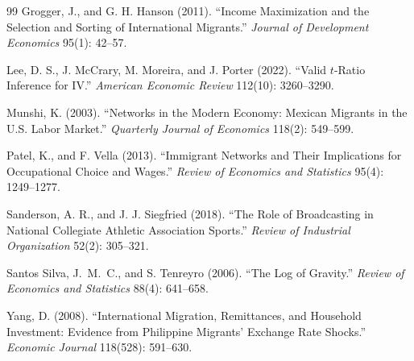 \documentclass[11pt]{article}
\begin{document}
\begin{thebibliography}{99}
Grogger, J., and G. H. Hanson (2011).
``Income Maximization and the Selection and Sorting of International
Migrants.''
\textit{Journal of Development Economics} 95(1): 42--57.

Lee, D. S., J. McCrary, M. Moreira, and J. Porter (2022).
``Valid $t$-Ratio Inference for IV.''
\textit{American Economic Review} 112(10): 3260--3290.

Munshi, K. (2003).
``Networks in the Modern Economy: Mexican Migrants in the U.S.
Labor Market.''
\textit{Quarterly Journal of Economics} 118(2): 549--599.

Patel, K., and F. Vella (2013).
``Immigrant Networks and Their Implications for Occupational Choice
and Wages.''
\textit{Review of Economics and Statistics} 95(4): 1249--1277.

Sanderson, A. R., and J. J. Siegfried (2018).
``The Role of Broadcasting in National Collegiate Athletic
Association Sports.''
\textit{Review of Industrial Organization} 52(2): 305--321.

Santos Silva, J.\ M.\ C., and S. Tenreyro (2006).
``The Log of Gravity.''
\textit{Review of Economics and Statistics} 88(4): 641--658.

Yang, D. (2008). ``International Migration, Remittances, and
Household Investment: Evidence from Philippine Migrants' Exchange
Rate Shocks.''
\textit{Economic Journal} 118(528): 591--630.

\end{thebibliography}
\end{document}
